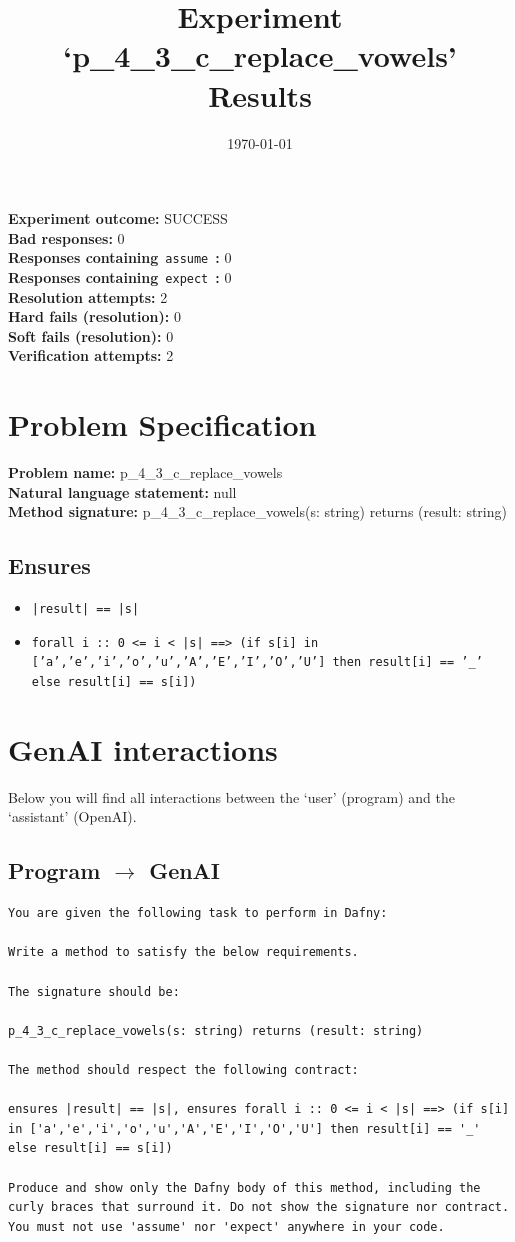 \documentclass{article}
\begin{document}
\title{Experiment `p\_4\_3\_c\_replace\_vowels' Results}
\author{\today}
\date{}
\maketitle
\textbf{Experiment outcome: }SUCCESS
\\\textbf{Bad responses: }0
\\\textbf{Responses containing}~\texttt{assume}~\textbf{: }0
\\\textbf{Responses containing}~\texttt{expect}~\textbf{: }0
\\\textbf{Resolution attempts: }2
\\\textbf{Hard fails (resolution): }0
\\\textbf{Soft fails (resolution): }0
\\\textbf{Verification attempts: }2
\section*{Problem Specification}
\textbf{Problem name: }p\_4\_3\_c\_replace\_vowels
\\\textbf{Natural language statement: }null
\\\textbf{Method signature: }p\_4\_3\_c\_replace\_vowels(s: string) returns (result: string)
\subsection*{Ensures}
\begin{itemize}
\item \texttt{|result| == |s|}
\item \texttt{forall i :: 0 <= i < |s| ==> (if s[i] in ['a','e','i','o','u','A','E','I','O','U'] then result[i] == '\_' else result[i] == s[i])}
\end{itemize}
\clearpage
\section*{GenAI interactions}
Below you will find all interactions between the `user' (program) and the `assistant' (OpenAI).
\subsection*{Program $\rightarrow$ GenAI}
\begin{lstlisting}
You are given the following task to perform in Dafny:

Write a method to satisfy the below requirements.

The signature should be:

p_4_3_c_replace_vowels(s: string) returns (result: string)

The method should respect the following contract:

ensures |result| == |s|, ensures forall i :: 0 <= i < |s| ==> (if s[i] in ['a','e','i','o','u','A','E','I','O','U'] then result[i] == '_' else result[i] == s[i])

Produce and show only the Dafny body of this method, including the curly braces that surround it. Do not show the signature nor contract. You must not use 'assume' nor 'expect' anywhere in your code.
\end{lstlisting}
\end{document}
